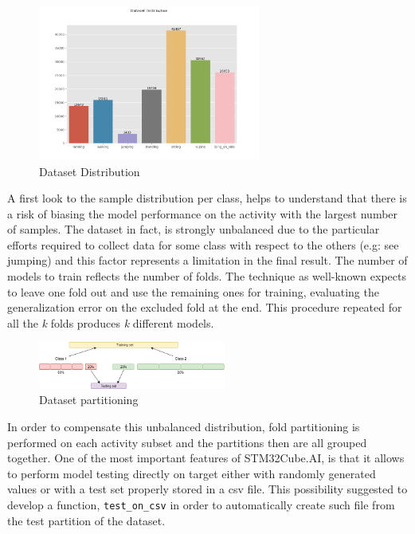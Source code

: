 \begin{figure}
	\vspace{-20pt}
	\hfill\includegraphics[width=0.65\textwidth]{figures/data_dist.png}\hspace*{\fill}
	\caption{Dataset Distribution}\label{fig:10}
	\centering
\end{figure}
A first look to the sample distribution per class, helps to understand that there is a risk of biasing the model performance on the activity with the largest number of samples. The dataset in fact, is strongly unbalanced due to the particular efforts required to collect data for some class with respect to the others (e.g: see jumping) and this factor represents a limitation in the final result.\newline
The number of models to train reflects the number of folds. The technique as well-known expects to leave one fold out and use the remaining ones for training, evaluating the generalization error on the excluded fold at the end. This procedure repeated for all the \textit{k} folds produces \textit{k} different models. \\
\par
\begin{figure}
	\hfill\includegraphics[width=0.55\textwidth]{figures/k_fold_part.png}\hspace*{\fill}
	\caption{Dataset partitioning}\label{fig:11}
	\centering
\end{figure}
In order to compensate this unbalanced distribution, fold partitioning is performed on each activity subset and the partitions then are all grouped together. \newline
One of the most important features of STM32Cube.AI, is that it allows to perform model testing directly on target either with randomly generated values or with a test set properly stored in a csv file. This possibility suggested to develop a function, \texttt{test_on_csv} in order to automatically create such file from the test partition of the dataset. \newline
